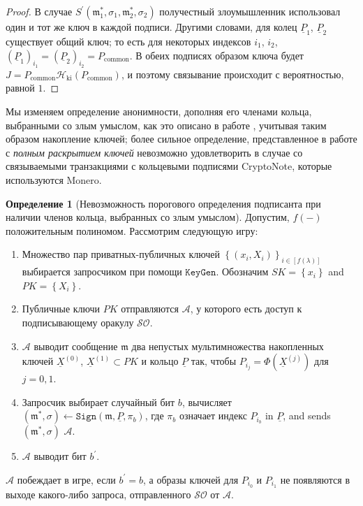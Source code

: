 \documentclass{mrl}
\theoremstyle{definition}
\numberwithin{theorem}{subsection}
\newtheorem{defn}[theorem]{Определение}
\newcommand{\adversary}{\mathcal{A}}
\begin{document}
\begin{proof}
В случае $S^\prime(\mathfrak{m}_1^*, \sigma_1, \mathfrak{m}^*_2, \sigma_2)$ получестный злоумышленник использовал один и тот же ключ в каждой подписи. Другими словами, для колец $\underline{P}_1$, $\underline{P}_2$ существует общий ключ; то есть для некоторых индексов $i_1$, $i_2$, $(\underline{P}_1)_{i_1} = (\underline{P}_2)_{i_2} = P_{\text{common}}$. В обеих подписях образом ключа будет $J = P_{\text{common}}\mathcal{H}_{\text{ki}}(P_{\text{common}})$, и поэтому связывание происходит с вероятностью, равной $1$.
\end{proof}

Мы изменяем определение анонимности, дополняя его членами кольца, выбранными со злым умыслом, как это описано в работе \cite{bender2006ring}, учитывая таким образом накопление ключей; более сильное определение, представленное в работе \cite{bender2006ring} с \textit{полным раскрытием ключей} невозможно удовлетворить в случае со связываемыми транзакциями с кольцевыми подписями CryptoNote, которые используются Monero.

\begin{defn}[Невозможность порогового определения подписанта при наличии членов кольца, выбранных со злым умыслом]
Допустим, $f(-)$ положительным полиномом. Рассмотрим следующую игру:
\begin{enumerate}
\item Множество пар приватных-публичных ключей $\left\{(x_i, X_i)\right\}_{i\in [f(\lambda)]}$ выбирается запросчиком при помощи $\texttt{KeyGen}$. Обозначим $SK = \left\{x_i\right\}$ and $PK = \left\{X_i\right\}$.

\item Публичные ключи $PK$ отправляются $\adversary$, у которого есть доступ к подписывающему оракулу $\mathcal{SO}$.

\item $\adversary$ выводит сообщение $\mathfrak{m}$ два непустых мультимножества накопленных ключей $\underline{X}^{(0)}$, $\underline{X}^{(1)} \subset PK$ и кольцо $\underline{P}$ так, чтобы $P_{i_j} = \Phi(\underline{X}^{(j)})$ для $j = 0, 1$.

\item Запросчик выбирает случайный бит $b$, вычисляет $(\mathfrak{m}^*, \sigma) \leftarrow \texttt{Sign}(\mathfrak{m}, \underline{P}, \pi_b)$, где $\pi_b$ означает индекс $P_{i_b}$ in $\underline{P}$, and sends $(\mathfrak{m}^*, \sigma)$ $\adversary$.

\item $\adversary$ выводит бит $b^\prime$.
\end{enumerate} $\adversary$ побеждает в игре, если $b^\prime = b$, а образы ключей для $P_{i_0}$ и $P_{i_1}$ не появляются в выходе какого-либо запроса, отправленного $\mathcal{SO}$ от $\adversary$.
\end{defn}
\end{document}
